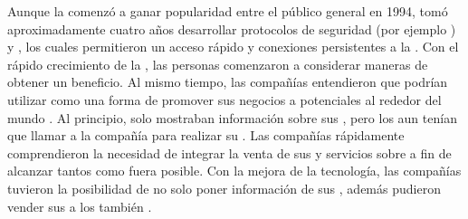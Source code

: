 		Aunque la \internetINT comenzó a ganar popularidad  entre el público general en 1994, tomó aproximadamente cuatro años desarrollar protocolos de seguridad (por ejemplo \httpNAME) y \dslModemNAME, los cuales permitieron un acceso rápido y conexiones persistentes a la \internetINT. Con el rápido crecimiento de la \internetINT, las personas comenzaron a considerar maneras de obtener un beneficio. Al mismo tiempo, las compañías entendieron que podrían utilizar \internetINT  como una forma de promover sus negocios a potenciales \customersCOM al rededor del mundo \cite{cook2015mobile}. Al principio, solo mostraban información sobre sus \itemsCOM, pero los \customersCOM aun tenían que llamar a la compañía para realizar su \orderCommerce. Las compañías rápidamente comprendieron la necesidad de integrar la venta de sus \itemsCOM y servicios sobre \internetINT a fin de alcanzar tantos \customersCOM como fuera posible. Con la mejora de la tecnología, las compañías tuvieron la posibilidad de no solo poner información de sus \itemsCOM \online, además pudieron vender sus \itemsCOM a los \customersCOM  también \cite{Maamar2003commerce}.


